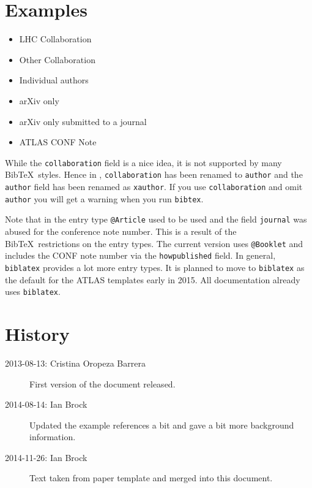 \documentclass[UKenglish]{latex/atlasdoc}
\newcommand*{\BibTeX}{Bib\TeX}
\newcommand{\Package}[1]{\texttt{#1}\xspace}
\begin{document}
\section{Examples}

\begin{itemize}
\item LHC Collaboration~\cite{lhcCollaboration:2012}
\item Other Collaboration~\cite{otherCollaboration:2007}
\item Individual authors~\cite{authors:2008}
\item arXiv only~\cite{arxivOnly:2009}
\item arXiv only submitted to a journal~\cite{arxivSub:2011}
\item ATLAS CONF Note~\cite{atlasConf:2012}
\end{itemize}

While the \texttt{collaboration} field is a nice idea, it is not supported by many \BibTeX\ styles.
Hence in , \texttt{collaboration} has been renamed to \texttt{author} and
the \texttt{author} field has been renamed as \texttt{xauthor}. If you use \texttt{collaboration} and omit
\texttt{author} you will get a warning when you run \texttt{bibtex}.

Note that in  the entry type \texttt{@Article} used to be used and the field \texttt{journal} 
was abused for the conference note number. This is a result of the \BibTeX\ restrictions on the entry types.
The current version uses \texttt{@Booklet} and includes the CONF note number via the \texttt{howpublished} field.
In general, \texttt{biblatex} provides a lot more entry types.
It is planned to move to \texttt{biblatex} as the default for the ATLAS templates early in 2015.
All documentation already uses \Package{biblatex}.


\section*{History}

\begin{description}
\item[2013-08-13: Cristina Oropeza Barrera] First version of the document released.
\item[2014-08-14: Ian Brock] Updated the example references a bit and gave a bit more background information.
\item[2014-11-26: Ian Brock] Text taken from paper template and merged into this document.
\end{description}
\end{document}
